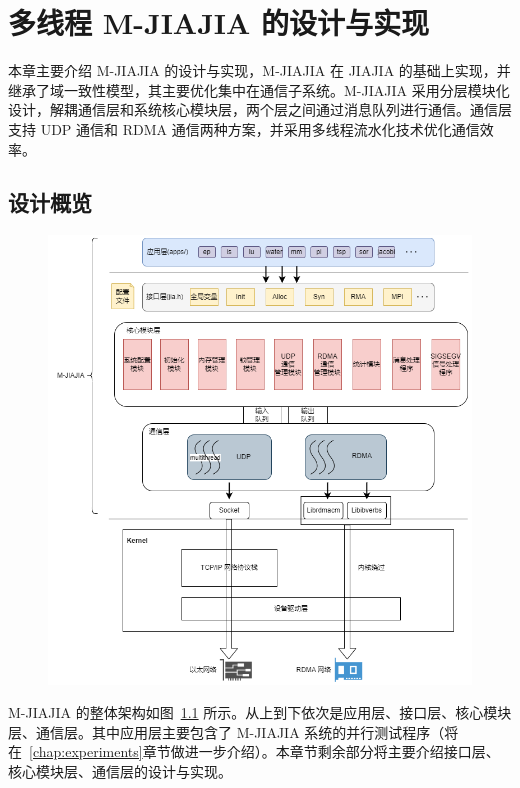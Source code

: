 \chapter{多线程 M-JIAJIA 的设计与实现}\label{chap:MJIAJIA}{
    本章主要介绍 M-JIAJIA 的设计与实现，M-JIAJIA 在 JIAJIA 的基础上实现，并继承了域一致性模型，其主要优化集中在通信子系统。M-JIAJIA 采用分层模块化设计，解耦通信层和系统核心模块层，两个层之间通过消息队列进行通信。通信层支持 UDP 通信和 RDMA 通信两种方案，并采用多线程流水化技术优化通信效率。

    \section{设计概览}
    \begin{figure}[!htbp]
        \centering
        \includegraphics[width=\textwidth]{Img/system-arch.png}
        \label{fig:system-arch}
    \end{figure}
    M-JIAJIA 的整体架构如图~\ref{fig:system-arch} 所示。从上到下依次是应用层、接口层、核心模块层、通信层。其中应用层主要包含了 M-JIAJIA 系统的并行测试程序（将在~\ref{chap:experiments}章节做进一步介绍）。本章节剩余部分将主要介绍接口层、核心模块层、通信层的设计与实现。

}
